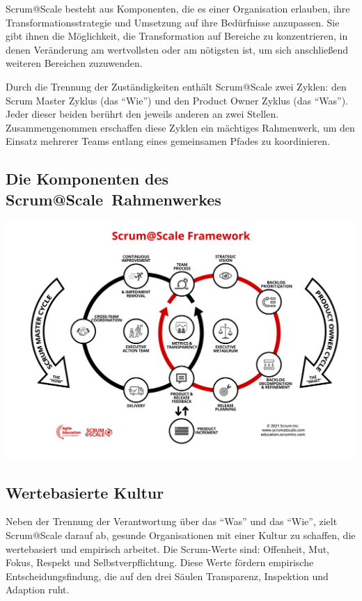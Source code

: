 \documentclass[12pt,a4paper,parskip=full]{scrartcl}
\begin{document}
Scrum@Scale besteht aus Komponenten, die es einer Organisation erlauben, ihre
Transformationsstrategie und Umsetzung auf ihre Bedürfnisse anzupassen. Sie gibt
ihnen die Möglichkeit, die Transformation auf Bereiche zu konzentrieren, in
denen Veränderung am wertvollsten oder am nötigsten ist, um sich anschließend
weiteren Bereichen zuzuwenden.

Durch die Trennung der Zuständigkeiten enthält Scrum@Scale zwei Zyklen: den
Scrum Master Zyklus (das ``Wie'') und den Product Owner Zyklus (das ``Was'').
Jeder dieser beiden berührt den jeweils anderen an zwei Stellen. Zusammengenommen
erschaffen diese Zyklen ein mächtiges Rahmenwerk, um den Einsatz mehrerer Teams
entlang eines gemeinsamen Pfades zu koordinieren.

\subsection{Die Komponenten des Scrum@Scale\textregistered ~Rahmenwerkes}

\includegraphics[width=1.0\linewidth]{SMPO-Cycle.png}

\subsection{Wertebasierte Kultur}
Neben der Trennung der Verantwortung über das ``Was'' und das ``Wie'', zielt
Scrum@Scale darauf ab, gesunde Organisationen mit einer Kultur zu schaffen, die
wertebasiert und empirisch arbeitet. Die Scrum-Werte sind:
Offenheit, Mut, Fokus, Respekt und Selbstverpflichtung. Diese Werte fördern
empirische Entscheidungsfindung, die auf den drei Säulen
Transparenz, Inspektion und Adaption ruht.
\end{document}
